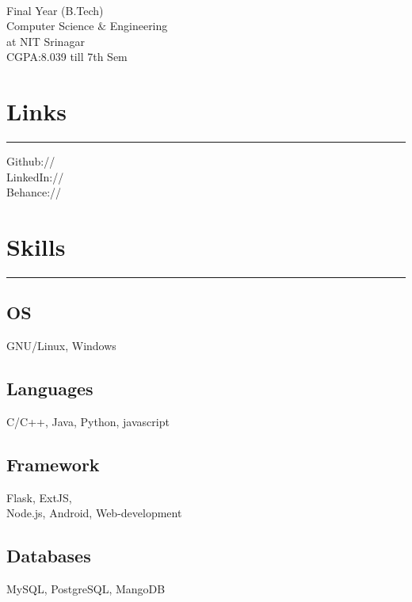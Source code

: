 \documentclass[]{rahulworld-resume}
\begin{document}
%
%

\begin{minipage}[t]{0.33\textwidth} 
\begin{large}
	\\
\end{large}
Final Year (B.Tech)\\
Computer Science $\&$  Engineering\\ 
at NIT Srinagar \\ 
CGPA:8.039 till 7th Sem 
\section{Links} 
\noindent\rule{5cm}{0.4pt}

Github:// \href{https://github.com/rahulworld}{} \\
LinkedIn://  \href{https://www.linkedin.com/in/rahulworld}{} \\
Behance://  \href{https://www.behance.net/rahul_world}{} 
\section{Skills}
\noindent\rule{5cm}{0.4pt}
\subsection{OS}
GNU/Linux, Windows
\vspace{6pt}
\subsection{Languages}
C/C++, Java, Python, javascript
\vspace{6pt}
\subsection{Framework}
Flask, ExtJS, \\Node.js, Android,
Web-development
\vspace{6pt}
\subsection{Databases}
MySQL, PostgreSQL, MangoDB
\vspace{6pt}

\end{minipage}
\end{document}
